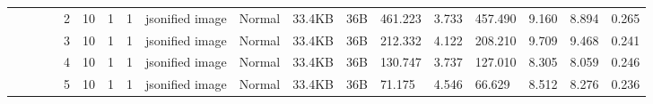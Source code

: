 \begin{landscape}
\begin{table}[]
{\begin{tabular}{@{}ccccllllllllllllll@{}}
                                                                                   &                              &                                &                                                                                                          & 2                                                     & 10                                       & 1                                          & 1                                 & jsonified image                  & Normal                             & 33.4KB                                        & 36B                                             & 461.223                 & 3.733    & 457.490                      & 9.160                   & 8.894    & 0.265                        \\
                                                                                   &                              &                                &                                                                                                          & 3                                                     & 10                                       & 1                                          & 1                                 & jsonified image                  & Normal                             & 33.4KB                                        & 36B                                             & 212.332                 & 4.122    & 208.210                      & 9.709                   & 9.468    & 0.241                        \\
                                                                                   &                              &                                &                                                                                                          & 4                                                     & 10                                       & 1                                          & 1                                 & jsonified image                  & Normal                             & 33.4KB                                        & 36B                                             & 130.747                 & 3.737    & 127.010                      & 8.305                   & 8.059    & 0.246                        \\
                                                                                   &                              &                                &                                                                                                          & 5                                                     & 10                                       & 1                                          & 1                                 & jsonified image                  & Normal                             & 33.4KB                                        & 36B                                             & 71.175                  & 4.546    & 66.629                       & 8.512                   & 8.276    & 0.236                        \\

\end{tabular}}
\end{table}
\end{landscape}

